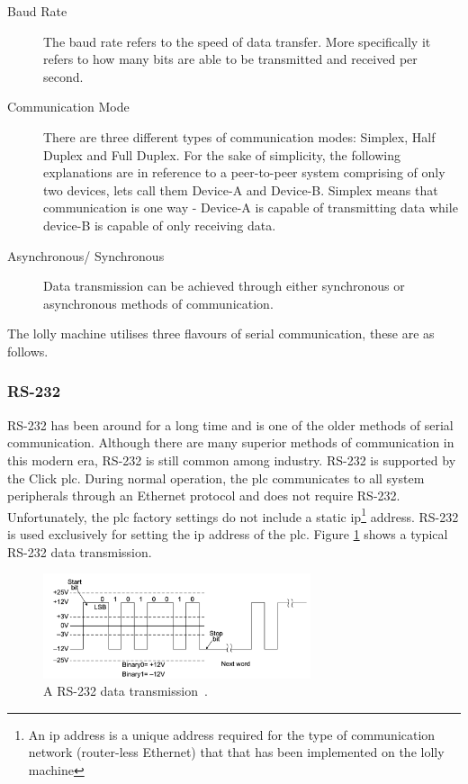     \begin{description}
    
    \item[Baud Rate] The baud rate refers to the speed of data transfer. More specifically it refers to how many bits are able to be transmitted and received per second. 
    
    \item[Communication Mode] There are three different types of communication modes: Simplex, Half Duplex and Full Duplex. For the sake of simplicity, the following explanations are in reference to a peer-to-peer system comprising of only two devices, lets call them Device-A and Device-B. Simplex means that communication is one way - Device-A is capable of transmitting data while device-B is capable of only receiving data.
    
    \item[Asynchronous/ Synchronous] Data transmission can be achieved through either synchronous or asynchronous methods of communication. 
    
    \end{description}
    
    The lolly machine utilises three flavours of serial communication, these are as follows.
    
    \subsubsection{RS-232}
    RS-232 has been around for a long time and is one of the older methods of serial communication. Although there are many superior methods of communication in this modern era, RS-232 is still common among industry. 
    RS-232 is supported by the Click \acrshort{plc}. During normal operation, the \acrshort{plc} communicates to all system peripherals through an Ethernet protocol and does not require RS-232. Unfortunately, the \acrshort{plc} factory settings do not include a static \acrshort{ip}\footnote{An \acrshort{ip} address is a unique address required for the type of communication network (router-less Ethernet) that that has been implemented on the lolly machine} address.  RS-232 is used exclusively for setting the \acrshort{ip} address of the \acrshort{plc}. Figure \ref{fig:rs232Trans} shows a typical RS-232 data transmission. 

    \begin{figure}[H]
        \centering
        \includegraphics[width = 0.7\textwidth]{2_images/rs232Trans.png}
        \caption{A RS-232 data transmission~\cite{frenzel2015handbook}.}
        \label{fig:rs232Trans}
    \end{figure}   
    
